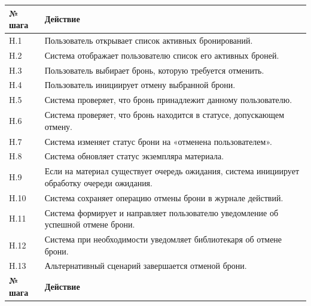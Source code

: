 \documentclass[12pt,a4paper]{article}
\begin{document}
\begin{xltabular}{\textwidth}{
				|>{\raggedright\arraybackslash}p{2.7cm}
				|>{\raggedright\arraybackslash}X|
			}
			
			\textbf{№ шага} & \textbf{Действие} \\
			\hline
			
			H.1 & Пользователь открывает список активных бронирований. \\
			\hline
			H.2 & Система отображает пользователю список его активных броней. \\
			\hline
			H.3 & Пользователь выбирает бронь, которую требуется отменить. \\
			\hline
			H.4 & Пользователь инициирует отмену выбранной брони. \\
			\hline
			H.5 & Система проверяет, что бронь принадлежит данному пользователю. \\
			\hline
			H.6 & Система проверяет, что бронь находится в статусе, допускающем
			отмену. \\
			\hline
			H.7 & Система изменяет статус брони на «отменена пользователем». \\
			\hline
			H.8 & Система обновляет статус экземпляра материала. \\
			\hline
			H.9 & Если на материал существует очередь ожидания, система инициирует
			обработку очереди ожидания. \\
			\hline
			H.10 & Система сохраняет операцию отмены брони в журнале действий. \\
			\hline
			H.11 & Система формирует и направляет пользователю уведомление об
			успешной отмене брони. \\
			\hline
			H.12 & Система при необходимости уведомляет библиотекаря об отмене брони. \\
			\hline
			H.13 & Альтернативный сценарий завершается отменой брони. \\
			\hline
			
			
			\textbf{№ шага} & \textbf{Действие} \\
			\hline
			

\end{xltabular}
\end{document}
